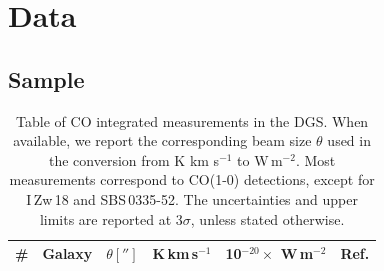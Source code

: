 \documentclass{aa}
\begin{document}
\section{Data}
\label{section_observations}
\subsection{Sample}
\label{section_sample}

\begin{table}[t!]
\begin{threeparttable}
\centering
\caption[Table of CO(1-0) integrated measurements in the DGS. When available, we report the corresponding beam size $\theta$ used in the conversion from K\,km\,s$^{-1}$ to W\,m$^{-2}$]{Table of CO integrated measurements in the DGS. When available, we report the corresponding beam size $\theta$ used in the conversion from K km s$^{-1}$ to W\,m$^{-2}$. Most measurements correspond to CO(1-0) detections, except for I\,Zw\,18 and SBS\,0335-52. The uncertainties and upper limits are reported at 3$\sigma$, unless stated otherwise.}
\label{table_CO_dgs}

\begin{tabular}{p{}p{}p{}p{}p{}p{}}
\# & Galaxy & $\theta ['']$ & K\,km\,s$^{-1}$ & 10$^{-20} \times$ W\,m$^{-2}$ & Ref.\\ \hline 


\end{tabular}
\end{threeparttable}
\end{table}
\end{document}
